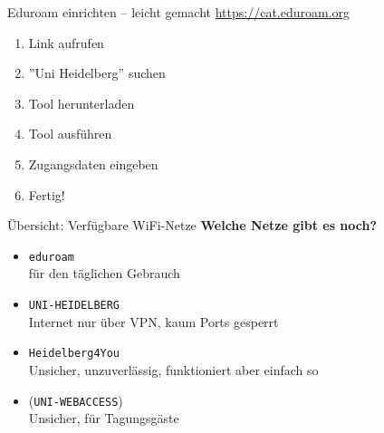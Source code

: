 \begin{frame}{Eduroam einrichten -- leicht gemacht}
    \large \url{https://cat.eduroam.org} \\
    \begin{minipage}[t]{0.515\textwidth}
        \begin{enumerate}
            \item<+-> Link aufrufen
            \item<+-> ''Uni Heidelberg'' suchen
            \item<+-> Tool herunterladen
            \item<+-> Tool ausführen
            \item<+-> Zugangsdaten eingeben
            \item<+-> Fertig!
        \end{enumerate}
    \end{minipage}
    \begin{minipage}[t]{0.4\textwidth}
        \vspace{0cm}
        \begin{center}
        \end{center}
    \end{minipage}
\end{frame}


\begin{frame}{Übersicht: Verfügbare WiFi-Netze}
    \large \textbf{Welche Netze gibt es noch?}
    \normalsize
    \begin{itemize}[<+->]
        \item \texttt{eduroam} \\
            für den täglichen Gebrauch
        \item \texttt{UNI-HEIDELBERG} \\
            Internet nur über VPN, kaum Ports gesperrt
        \item \texttt{Heidelberg4You} \\
            Unsicher, unzuverlässig, funktioniert aber einfach so
        \item (\texttt{UNI-WEBACCESS}) \\
            Unsicher, für Tagungsgäste
    \end{itemize}
\end{frame}


